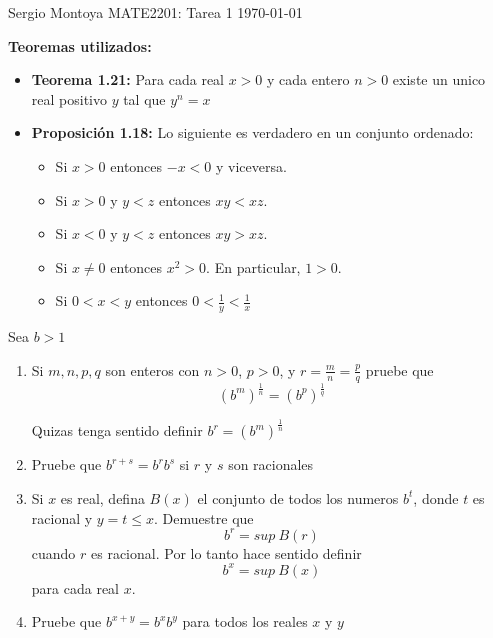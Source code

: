 \documentclass[12pt]{article}
\newenvironment{ex}[2][Ejercicio]{\begin{trivlist}
\item[\hskip \labelsep {\bfseries #1}\hskip \labelsep {\bfseries #2.}]}{\end{trivlist}}
\begin{document}

\noindent Sergio Montoya \hfill {\Large MATE2201: Tarea 1} \hfill \today

\textbf{Teoremas utilizados:}
\begin{itemize}
	\item \textbf{Teorema 1.21:} Para cada real $x > 0$ y cada entero $n > 0$ existe un unico real positivo $y$ tal que $y^n = x$
	\item \textbf{Proposición 1.18:} Lo siguiente es verdadero en un conjunto ordenado:
		\begin{itemize}
			\item Si $x > 0$ entonces $-x < 0$ y viceversa.
			\item Si $x > 0$ y $y < z$ entonces $xy < xz$.
			\item Si $x < 0$ y $y < z$ entonces $xy > xz$.
			\item Si $x \neq 0$ entonces $x^2 > 0$. En particular, $1 > 0$.
			\item Si $0 < x < y$ entonces $0 < \frac{1}{y} < \frac{1}{x}$
		\end{itemize}
\end{itemize}
\begin{ex}{1.6} 
	Sea $b > 1$
	\begin{enumerate}
		\item Si $m,n,p,q$ son enteros con $n > 0$, $p > 0$, y $r = \frac{m}{n} = \frac{p}{q}$ pruebe que $$(b^m)^{\frac{1}{n}} = (b^p)^{\frac{1}{q}}$$

			Quizas tenga sentido definir $b^r = (b^m)^{\frac{1}{n}}$
		\item Pruebe que $b^{r+s}=b^rb^s$ si $r$ y $s$ son racionales
		\item Si $x$ es real, defina $B(x)$ el conjunto de todos los numeros $b^t$, donde $t$ es racional y $y=t\le x$. Demuestre que $$b^r=sup\ B(r)$$ cuando $r$ es racional. Por lo tanto hace sentido definir $$b^x = sup\ B(x)$$ para cada real $x$.
		\item Pruebe que $b^{x+y} = b^xb^y $ para todos los reales $x$ y $y$
	\end{enumerate}

\end{ex}
\end{document}
